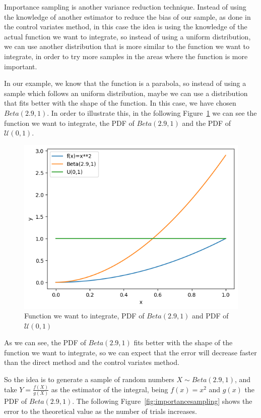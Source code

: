 \documentclass{article}
\begin{document}
Importance sampling is another variance reduction technique. Instead of using the knowledge of another estimator to reduce the bias of our sample, as done in the control variates method, in this case the idea is using the knowledge of the actual function we want to integrate, so instead of using a uniform distribution, we can use another distribution that is more similar to the function we want to integrate, in order to try more samples in the areas where the function is more important. 

In our example, we know that the function is a parabola, so instead of using a sample which follows an uniform distribution, maybe we can use a distribution that fits better with the shape of the function. In this case, we have chosen \(Beta(2.9,1)\). In order to illustrate this, in the following Figure~\ref{fig:beta42_f} we can see the function we want to integrate, the PDF of \(Beta(2.9,1)\) and the PDF of \(\mathcal{U}(0,1)\).

\begin{figure}[H]
	\centering
	\includegraphics[width=0.5\linewidth]{./Figures/VarianceReduction/beta.png}
	\caption{Function we want to integrate, PDF of \(Beta(2.9,1)\) and PDF of \(\mathcal{U}(0,1)\)}
	\label{fig:beta42_f}
\end{figure}

As we can see, the PDF of \(Beta(2.9,1)\) fits better with the shape of the function we want to integrate, so we can expect that the error will decrease faster than the direct method and the control variates method. 

So the idea is to generate a sample of random numbers \(X \sim Beta(2.9,1)\), and take \(Y = \frac{f(X)}{g(X)}\) as the estimator of the integral, being \(f(x) = x^2\) and \(g(x)\) the PDF of \(Beta(2.9,1)\). The following Figure~\ref{fig:importancesampling} shows the error to the theoretical value as the number of trials increases.
\end{document}
